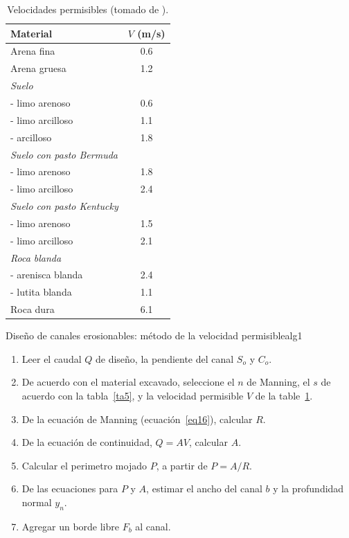 \documentclass[11pt, oneside]{article}
\begin{document}
\begin{table}[h!]
\centering
\begin{tabular}{l c}
 \hline
  Material & $V$ (m/s) \\ [0.5ex]
 \hline\hline
 Arena fina & 0.6 \\
 Arena gruesa & 1.2 \\
\emph{Suelo} & \\
- limo arenoso & 0.6 \\
- limo arcilloso & 1.1 \\
- arcilloso & 1.8 \\
\emph{Suelo con pasto Bermuda} & \\
- limo arenoso & 1.8 \\
- limo arcilloso & 2.4 \\
\emph{Suelo con pasto Kentucky} & \\
- limo arenoso & 1.5 \\
- limo arcilloso & 2.1 \\
\emph{Roca blanda} & \\
- arenisca blanda & 2.4 \\
- lutita blanda & 1.1 \\
Roca dura  & 6.1 \\
\hline
\end{tabular}
\caption{Velocidades permisibles (tomado de \cite{Chau}).}
\label{ta6}
\end{table}

\begin{alg}{Diseño de canales erosionables: m\'etodo de la velocidad permisible}{alg1}
\begin{enumerate}
\item Leer el caudal $Q$ de diseño, la pendiente del canal $S_o$ y $C_o$.
\item \label{st2} De acuerdo con el material excavado, seleccione el $n$ de Manning, el $s$ de acuerdo con la tabla~\ref{ta5}, y la velocidad permisible $V$ de la table~\ref{ta6}.
\item De la ecuaci\'on de Manning (ecuaci\'on~\ref{eq16}), calcular $R$.
\item De la ecuaci\'on de continuidad, $Q=AV$, calcular $A$.
\item Calcular el perimetro mojado $P$, a partir de $P=A/R$.
\item De las ecuaciones para $P$ y $A$, estimar el ancho del canal $b$ y la profundidad normal $y_n$.
\item \label{st5} Agregar un borde libre $F_b$ al canal.
\end{enumerate}
\end{alg}
\end{document}
